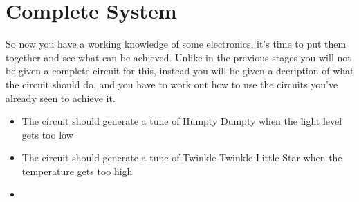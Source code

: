 \section{Complete System}
So now you have a working knowledge of some electronics, it's time to put them together and see what can be achieved.
Unlike in the previous stages you will not be given a complete circuit for this, instead you will be given a decription of what the circuit should do, and you have to work out how to use the circuits you've already seen to achieve it.

\begin{itemize}
\item The circuit should generate a tune of Humpty Dumpty when the light level gets too low
\item The circuit should generate a tune of Twinkle Twinkle Little Star when the temperature gets too high
\item 
\end{itemize}
